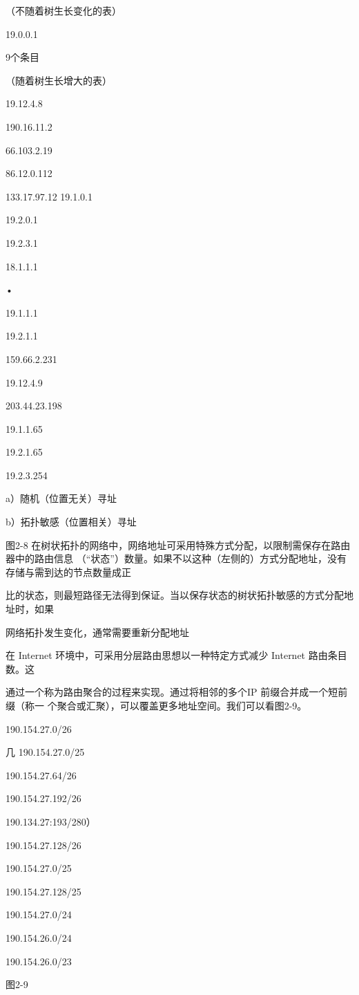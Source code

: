（不随着树生长变化的表）

19.0.0.1

9个条目

（随着树生长增大的表）

19.12.4.8

190.16.11.2

66.103.2.19

86.12.0.112

133.17.97.12 19.1.0.1

19.2.0.1

19.2.3.1

18.1.1.1

•

19.1.1.1

19.2.1.1

159.66.2.231

19.12.4.9

203.44.23.198

19.1.1.65

19.2.1.65

19.2.3.254

a）随机（位置无关）寻址

b）拓扑敏感（位置相关）寻址

图2-8 在树状拓扑的网络中，网络地址可采用特殊方式分配，以限制需保存在路由器中的路由信息
（“状态”）数量。如果不以这种（左侧的）方式分配地址，没有存储与需到达的节点数量成正

比的状态，则最短路径无法得到保证。当以保存状态的树状拓扑敏感的方式分配地址时，如果

网络拓扑发生变化，通常需要重新分配地址

在 Internet 环境中，可采用分层路由思想以一种特定方式减少 Internet 路由条目数。这

通过一个称为路由聚合的过程来实现。通过将相邻的多个IP 前缀合并成一个短前缀（称一
个聚合或汇聚），可以覆盖更多地址空间。我们可以看图2-9。

190.154.27.0/26

几 190.154.27.0/25

190.154.27.64/26

190.154.27.192/26

190.134.27:193/280）

190.154.27.128/26

190.154.27.0/25

190.154.27.128/25

190.154.27.0/24

190.154.26.0/24

190.154.26.0/23

图2-9

